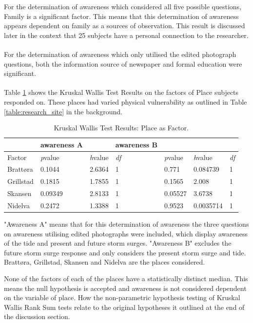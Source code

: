 For the determination of awareness which considered all five possible questions, Family is a significant factor. This means that this determination of awareness appears dependent on family as a sources of observation. This result is discussed later in the context that 25 subjects have a personal connection to the researcher.
\paragraph{}
For the determination of awareness which only utilised the edited photograph questions, both the information source of newspaper and formal education were significant.
\paragraph{}
Table \ref{kwtest_place} shows the Kruskal Wallis Test Results on the factors of Place subjects responded on. These places had varied physical vulnerability as outlined in Table \ref{table:research_site} in the background.

\begin{table}[H]
    \centering
    \begin{tabular}{|l|l|l|l|l|l|l|}
    \hline
~ & \textbf{awareness A} & ~ & \textbf{awareness B} & ~ &  \\ \hline
        Factor &\textit{p}value &\textit{h}value & \textit{df} &\textit{p}value &\textit{h}value & \textit{df}\\ \hline
         Brattøra & 0.1044  & 2.6364 & 1 & 0.771 & 0.084739 &1\\ \hline
        Grillstad & 0.1815 & 1.7855 & 1 & 0.1565 & 2.008 & 1 \\ \hline
       Skansen & 0.09349 & 2.8133 & 1 & 0.05527 & 3.6738 & 1\\ \hline
         Nidelva & 0.2472 & 1.3388 & 1 & 0.9523 &  0.0035714 & 1\\ \hline
    \end{tabular}
    \caption{Kruskal Wallis Test Results: Place as Factor.}{ "Awareness A" means that for this determination of awareness the three questions on awareness utilising edited photographs were included, which display awareness of the tide and present and future storm surges.  "Awareness B" excludes the future storm surge response and only considers the present storm surge and tide.  Brattøra, Grillstad, Skansen and Nidelva are the places considered.}
    \label{kwtest_place}
\end{table}
None of the factors of each of the places have a statistically distinct median. This means the null hypothesis is accepted and awareness is not considered dependent on the variable of place. 
  How the non-parametric hypothesis testing of Kruskal Wallis Rank Sum tests relate to the original hypotheses it outlined at the end of the discussion section.   
\paragraph{}

  









